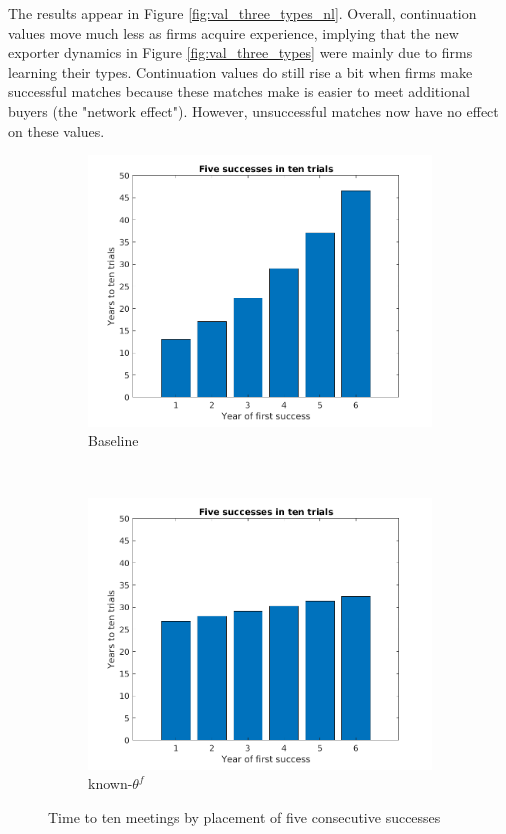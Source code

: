 \documentclass[12pt]{article}
\begin{document}
The results appear in Figure \ref{fig:val_three_types_nl}. Overall,
continuation values move much less as firms acquire experience, implying
that the new exporter dynamics in Figure \ref{fig:val_three_types} were
mainly due to firms learning their types. Continuation values do still rise
a bit when firms make successful matches because these matches make is
easier to meet additional buyers (the "network effect"). However,
unsuccessful matches now have no effect on these values.

\begin{figure}
    \centering
    \begin{subfigure}[b]{0.5\textwidth}
        \centering
        \includegraphics[width=\textwidth]{figures/success_order}
        \caption{Baseline}
    \end{subfigure}%
    ~
    \begin{subfigure}[b]{0.5\textwidth}
        \centering
        \includegraphics[width=\textwidth]{figures/success_order_nl}
        \caption{known-$\theta ^{f}$ }
    \end{subfigure}
    \caption{Time to ten meetings by placement of five consecutive successes}
    \label{fig:success_order}
\end{figure}
\end{document}
